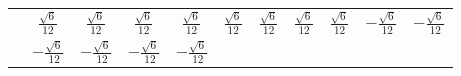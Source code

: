 \documentclass[fleqn,10pt,landscape]{article}
\begin{document}
\begin{itemize}
{\begin{center}
\begin{longtable}{ccccccccccc}
& $ \frac{\sqrt{6}}{12} $ & $ \frac{\sqrt{6}}{12} $ & $ \frac{\sqrt{6}}{12} $ & $ \frac{\sqrt{6}}{12} $ & $ \frac{\sqrt{6}}{12} $ & $ \frac{\sqrt{6}}{12} $ & $ \frac{\sqrt{6}}{12} $ & $ \frac{\sqrt{6}}{12} $ & $ - \frac{\sqrt{6}}{12} $ & $ - \frac{\sqrt{6}}{12} $ \\
& $ - \frac{\sqrt{6}}{12} $ & $ - \frac{\sqrt{6}}{12} $ & $ - \frac{\sqrt{6}}{12} $ & $ - \frac{\sqrt{6}}{12} $ & $  $ & $  $ & $  $ & $  $ & $  $ & $  $ \\
\end{longtable}
\end{center}
}
\end{itemize}
\end{document}
